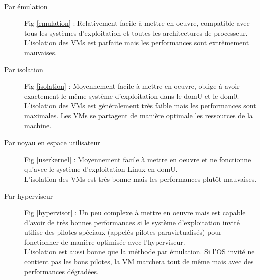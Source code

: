 \paragraph*{}
\begin{description}

	\item[Par émulation] Fig \ref{emulation} : Relativement facile à mettre en oeuvre, compatible avec tous les systèmes d'exploitation et toutes les architectures
	de processeur.\\
	L'isolation des VMs est parfaite mais les performances sont extrêmement mauvaises.

	\item[Par isolation] Fig \ref{isolation} : Moyennement facile à mettre en oeuvre, oblige à avoir exactement le même système d'exploitation dans le domU et le dom0.\\
	L'isolation des VMs est généralement très faible mais les performances sont maximales. Les VMs se partagent de manière optimale les ressources de la machine.

	\item[Par noyau en espace utilisateur] Fig \ref{userkernel} : Moyennement facile à mettre en oeuvre et ne fonctionne qu'avec le système d'exploitation Linux en domU.\\
	L'isolation des VMs est très bonne mais les performances plutôt mauvaises.

	\item[Par hyperviseur] Fig \ref{hypervisor} : Un peu complexe à mettre en oeuvre mais est capable d'avoir de très bonnes performances si le système d'exploitation invité
	utilise des pilotes spéciaux (appelés pilotes paravirtualisés) pour fonctionner de manière optimisée avec l'hyperviseur.\\
	L'isolation est aussi bonne que la méthode par émulation. Si l'OS invité ne contient pas les bons pilotes, la VM marchera tout de même mais
	avec des performances dégradées.

\end{description}

